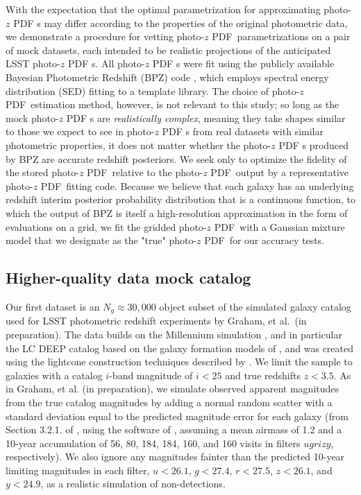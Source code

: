 \documentclass[\docopts]{\docclass}
\newcommand{\pz}{photo-$z$ PDF\xspace}
\begin{document}
With the expectation that the optimal parametrization for approximating \pz s 
may differ according to the properties of the original photometric data, we 
demonstrate a procedure for vetting \pz\ parametrizations on a pair of mock 
datasets, each intended to be realistic projections of the anticipated LSST \pz 
s.
All \pz s were fit using the publicly available Bayesian Photometric Redshift 
(BPZ) code \citep{benitez_bayesian_2000}, which employs spectral energy 
distribution (SED) fitting to a template library.
The choice of \pz\ estimation method, however, is not relevant to this study; 
so long as the mock \pz s are \textit{realistically complex}, meaning they take 
shapes similar to those we expect to see in \pz s from real datasets with 
similar photometric properties, it does not matter whether the \pz s produced 
by BPZ are accurate redshift posteriors.
We seek only to optimize the fidelity of the stored \pz\ relative to the \pz\ 
output by a representative \pz\ fitting code.
\citep[See][Schmidt, et al.\ in preparation for other work comparing the 
accuracy of \pz s produced by different methods.]{tanaka_photometric_2017}
Because we believe that each galaxy has an underlying redshift interim 
posterior probability distribution that is a continuous function, to which the 
output of BPZ is itself a high-resolution approximation in the form of 
evaluations on a grid, we fit the gridded \pz\ with a Gaussian mixture model 
that we designate as the "true" \pz\ for our accuracy tests.

\subsection{Higher-quality data mock catalog}
\label{sec:graham}

Our first dataset is an $N_{g}\approx30,000$ object subset of the simulated 
galaxy catalog used for LSST photometric redshift experiments by Graham, et 
al.\ (in preparation).
The data builds on the Millennium simulation \citep{springel_simulations_2005}, 
and in particular the LC DEEP catalog based on the galaxy formation models of 
\cite{gonzalez-perez_how_2014}, and was created using the lightcone 
construction techniques described by \cite{merson_lightcone_2013}.
We limit the sample to galaxies with a catalog $i$-band magnitude of $i<25$ and 
true redshifts $z<3.5$.
As in Graham, et al. (in preparation), we simulate observed apparent magnitudes 
from the true catalog magnitudes by adding a normal random scatter with a 
standard deviation equal to the predicted magnitude error for each galaxy (from 
Section 3.2.1. of \citealt{ivezic_lsst:_2008}, using the software of 
\citealt{connolly_end--end_2014}, assuming a mean airmass of 1.2 and a 10-year 
accumulation of 56, 80, 184, 184, 160, and 160 visits in filters $ugrizy$, 
respectively).
We also ignore any magnitudes fainter than the predicted 10-year limiting 
magnitudes in each filter, $u<26.1$, $g<27.4$, $r<27.5$, $z<26.1$, and 
$y<24.9$, as a realistic simulation of non-detections.
\end{document}
